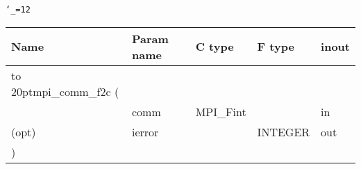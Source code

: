 \begingroup\tt\catcode`\_=12
\begin{tabular}{lllll}
\toprule
\textrm{Name}&\textrm{Param name}&\textrm{C type}&\textrm{F type}&\textrm{inout}\\
\midrule
\hbox to 20pt{mpi_comm_f2c (\hss} \\
&comm&MPI_Fint&&in\\
(opt)&ierror&&INTEGER&out\\
)\\
\bottomrule
\end{tabular}
\endgroup

